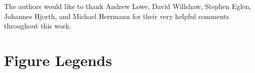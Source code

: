 \documentclass[10pt]{article}
\begin{document}
The authors would like to thank Andrew Lowe, David Willshaw, Stephen
Eglen, Johannes Hjorth, and Michael Herrmann for their very helpful
comments throughout this work.

\newcommand{\myshortjournaltitles}{}

%

\section*{Figure Legends}
\end{document}
